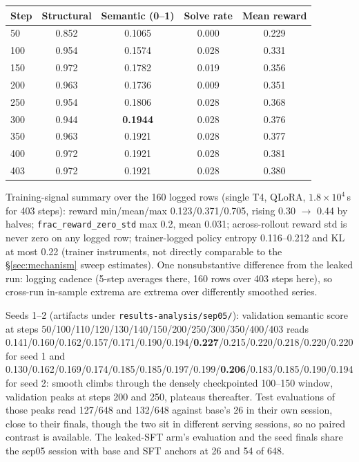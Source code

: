 \documentclass{article}
\begin{document}
\begin{table}[h]
\centering
\small
\setlength{\tabcolsep}{5pt}
\begin{tabular}{lcccc}
\toprule
Step & Structural & Semantic (0--1) & Solve rate & Mean reward \\
\midrule
50  & 0.852 & 0.1065 & 0.000 & 0.229 \\
100 & 0.954 & 0.1574 & 0.028 & 0.331 \\
150 & 0.972 & 0.1782 & 0.019 & 0.356 \\
200 & 0.963 & 0.1736 & 0.009 & 0.351 \\
250 & 0.954 & 0.1806 & 0.028 & 0.368 \\
300 & 0.944 & \textbf{0.1944} & 0.028 & 0.376 \\
350 & 0.963 & 0.1921 & 0.028 & 0.377 \\
400 & 0.972 & 0.1921 & 0.028 & 0.381 \\
403 & 0.972 & 0.1921 & 0.028 & 0.380 \\
\bottomrule
\end{tabular}
\end{table}

Training-signal summary over the 160 logged rows (single T4, QLoRA,
$1.8\times10^{4}$\,s for 403 steps): reward min/mean/max
0.123/0.371/0.705, rising 0.30 $\to$ 0.44 by halves;
\texttt{frac\_reward\_zero\_std} max 0.2, mean 0.031; across-rollout reward std is never zero on any logged row; trainer-logged policy entropy 0.116--0.212 and KL at most 0.22 (trainer instruments, not directly comparable to the \S\ref{sec:mechanism} sweep estimates). One nonsubstantive difference from the leaked run: logging cadence (5-step averages there, 160 rows over 403 steps here), so cross-run in-sample extrema are extrema over differently smoothed series.

Seeds 1--2 (artifacts under \texttt{results-analysis/sep05/}): validation semantic score at steps 50/100/110/120/130/140/150/200/250/300/350/400/403 reads 0.141/0.160/0.162/0.157/0.171/0.190/0.194/\textbf{0.227}/0.215/0.220/0.218/0.220/0.220 for seed 1 and 0.130/0.162/0.169/0.174/0.185/0.185/0.197/0.199/\textbf{0.206}/0.183/0.185/0.190/0.194 for seed 2: smooth climbs through the densely checkpointed 100--150 window, validation peaks at steps 200 and 250, plateaus thereafter. Test evaluations of those peaks read 127/648 and 132/648 against base's 26 in their own session, close to their finals, though the two sit in different serving sessions, so no paired contrast is available. The leaked-SFT arm's evaluation and the seed finals share the sep05 session with base and SFT anchors at 26 and 54 of 648.
\end{document}
